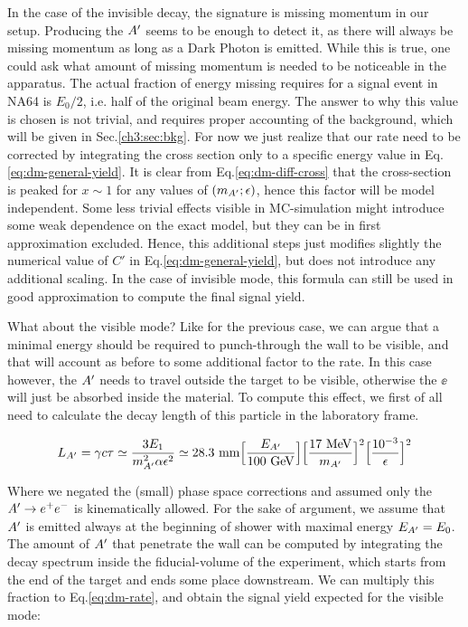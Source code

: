 In the case of the invisible decay, the signature is missing momentum in our setup. Producing the $A'$ seems to be enough to detect it, as there will always be missing momentum as long as a Dark Photon is emitted. While this is true, one could ask what amount of missing momentum is needed to be noticeable in the apparatus. The actual fraction of energy missing requires for a signal event in NA64 is $E_0/2$, i.e. half of the original beam energy. The answer to why this value is chosen is not trivial, and requires proper accounting of the background, which will be given in Sec.\ref{ch3:sec:bkg}.  For now we just realize that our rate need to be corrected by integrating the cross section only to a specific energy value in Eq.\ref{eq:dm-general-yield}. It is clear from Eq.\ref{eq:dm-diff-cross} that the cross-section is peaked for $x \sim 1$ for any values of $(m_{A'};\epsilon)$, hence this factor will be model independent. Some less trivial effects visible in MC-simulation might introduce some weak dependence on the exact model, but they can be in first approximation excluded. Hence, this additional steps just modifies slightly the numerical value of $C'$ in Eq.\ref{eq:dm-general-yield}, but does not introduce any additional scaling. In the case of invisible mode, this formula can still be used in good approximation to compute the final signal yield.

What about the visible mode? Like for the previous case, we can argue that a minimal energy should be required to punch-through the wall to be visible, and that will account as before to some additional factor to the rate. In this case however, the $A'$ needs to travel outside the target to be visible, otherwise the $\ee$ will just be absorbed inside the material. To compute this effect, we first of all need to calculate the decay length of this particle in the laboratory frame.


\begin{eqnarray}
  L_{A'} = \gamma c \tau \simeq \frac{3E_1}{m^2_{A'}\alpha \epsilon^2} \simeq 28.3 ~{\rm mm}  \Bigl[\frac{E_{A'}}{100~ {\rm GeV}}\Bigr] 
  \Bigl[\frac{17~ {\rm MeV}}{m_{A'}}\Bigr]^2 \Bigl[\frac{10^{-3}}{\epsilon}\Bigr]^2
  \label{eq:dm-decay-length}
\end{eqnarray}

Where we negated the (small) phase space corrections and assumed only the $A' \to e^+e^-$ is kinematically allowed. For the sake of argument, we assume that $A'$ is emitted always at the beginning of shower with maximal energy $E_{A'} = E_0$. The amount of $A'$ that penetrate the wall can be computed by integrating the decay spectrum inside the fiducial-volume of the experiment, which starts from the end of the target and ends some place downstream. We can multiply this fraction to Eq.\ref{eq:dm-rate}, and obtain the signal yield expected for the visible mode:

